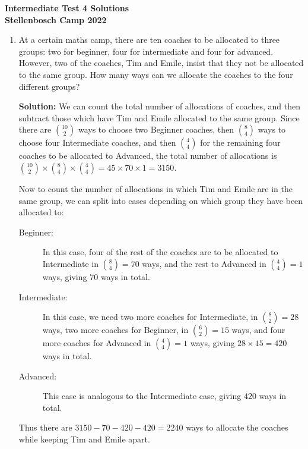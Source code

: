 \documentclass{article}
\begin{document}
\thispagestyle{empty}

\begin{center} \bfseries
  \Large Intermediate Test 4 Solutions
  \\ \vspace{12pt}
  \large Stellenbosch Camp 2022
\end{center}

\bigskip \bigskip

\begin{enumerate}[itemsep=24pt]

\item %
At a certain maths camp, there are ten coaches to be allocated to three groups: two for beginner, four for intermediate and four for advanced.
However, two of the coaches, Tim and Emile, insist that they not be allocated to the same group.
How many ways can we allocate the coaches to the four different groups?

\textbf{Solution:}
We can count the total number of allocations of coaches, and then subtract those which have Tim and Emile allocated to the same group.
Since there are $\binom{10}{2}$ ways to choose two Beginner coaches, then $\binom{8}{4}$ ways to choose four Intermediate coaches, and then $\binom{4}{4}$ for the remaining four coaches to be allocated to Advanced, the total number of allocations is $\binom{10}{2} \times \binom{8}{4} \times \binom {4}{4} = 45 \times 70 \times 1 = 3150$.

Now to count the number of allocations in which Tim and Emile are in the same group, we can split into cases depending on which group they have been allocated to:
\begin{description}
  \item[Beginner:] In this case, four of the rest of the coaches are to be allocated to Intermediate in $\binom{8}{4} = 70$ ways, and the rest to Advanced in $\binom{4}{4} = 1$ ways, giving $70$ ways in total.
  \item[Intermediate:] In this case, we need two more coaches for Intermediate, in $\binom{8}{2} = 28$ ways, two more coaches for Beginner, in $\binom{6}{2} = 15$ ways, and four more coaches for Advanced in $\binom{4}{4} = 1$ ways, giving $28 \times 15 = 420$ ways in total.
  \item[Advanced:] This case is analogous to the Intermediate case, giving $420$ ways in total.
\end{description}
Thus there are $3150 -70 -420 -420 = 2240$ ways to allocate the coaches while keeping Tim and Emile apart.



\end{enumerate}
\end{document}

